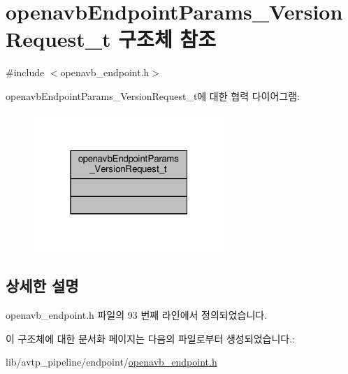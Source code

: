 \hypertarget{structopenavb_endpoint_params___version_request__t}{}\section{openavb\+Endpoint\+Params\+\_\+\+Version\+Request\+\_\+t 구조체 참조}
\label{structopenavb_endpoint_params___version_request__t}


{\ttfamily \#include $<$openavb\+\_\+endpoint.\+h$>$}



openavb\+Endpoint\+Params\+\_\+\+Version\+Request\+\_\+t에 대한 협력 다이어그램\+:
\nopagebreak
\begin{figure}[H]
\begin{center}
\leavevmode
\includegraphics[width=205pt]{structopenavb_endpoint_params___version_request__t__coll__graph}
\end{center}
\end{figure}


\subsection{상세한 설명}


openavb\+\_\+endpoint.\+h 파일의 93 번째 라인에서 정의되었습니다.



이 구조체에 대한 문서화 페이지는 다음의 파일로부터 생성되었습니다.\+:\begin{DoxyCompactItemize}
\item 
lib/avtp\+\_\+pipeline/endpoint/\hyperlink{openavb__endpoint_8h}{openavb\+\_\+endpoint.\+h}\end{DoxyCompactItemize}
